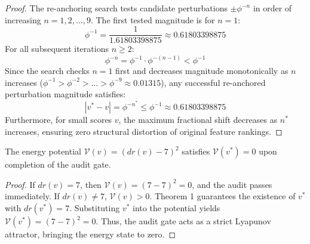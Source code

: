\begin{proof}
The re-anchoring search tests candidate perturbations $\pm \phi^{-n}$ in order of increasing $n = 1, 2, \dots, 9$.
The first tested magnitude is for $n=1$:
\begin{equation}
    \phi^{-1} = \frac{1}{1.61803398875} \approx 0.61803398875
\end{equation}
For all subsequent iterations $n \ge 2$:
\begin{equation}
    \phi^{-n} = \phi^{-1} \cdot \phi^{-(n-1)} < \phi^{-1}
\end{equation}
Since the search checks $n=1$ first and decreases magnitude monotonically as $n$ increases ($\phi^{-1} > \phi^{-2} > \dots > \phi^{-9} \approx 0.01315$), any successful re-anchored perturbation magnitude satisfies:
\begin{equation}
    |v^* - v| = \phi^{-n^*} \le \phi^{-1} \approx 0.61803398875
\end{equation}
Furthermore, for small scores $v$, the maximum fractional shift decreases as $n^*$ increases, ensuring zero structural distortion of original feature rankings.
\end{proof}

\begin{lemma}
The energy potential $\mathcal{V}(v) = (dr(v) - 7)^2$ satisfies $\mathcal{V}(v^*) = 0$ upon completion of the audit gate.
\end{lemma}

\begin{proof}
If $dr(v) = 7$, then $\mathcal{V}(v) = (7 - 7)^2 = 0$, and the audit passes immediately.
If $dr(v) \neq 7$, $\mathcal{V}(v) > 0$. Theorem 1 guarantees the existence of $v^*$ with $dr(v^*) = 7$.
Substituting $v^*$ into the potential yields $\mathcal{V}(v^*) = (7 - 7)^2 = 0$.
Thus, the audit gate acts as a strict Lyapunov attractor, bringing the energy state to zero.
\end{proof}
